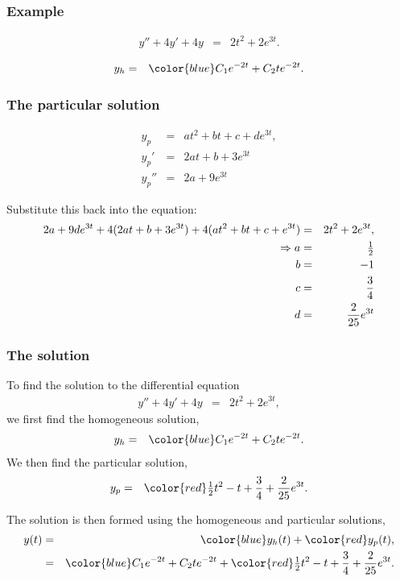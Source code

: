 \begin{frame}
  \frametitle{Example}

  \begin{eqnarray*}
    y'' + 4y' + 4y & = & 2t^2 + 2 e^{3t}.
  \end{eqnarray*}

  {
    \begin{eqnarray*}
      y_h & = & {\color{blue}C_1 e^{-2t} + C_2 t e^{-2t}}.
    \end{eqnarray*}
  }

\end{frame}


\begin{frame}
  \frametitle{The particular solution}

  \begin{eqnarray*}
    y_p & = & at^2 + bt + c + d e^{3t}, \\
    y_p' & = & 2at + b + 3e^{3t} \\
    y_p'' & = & 2a + 9 e^{3t}
  \end{eqnarray*}

  Substitute this back into the equation:
  \begin{eqnarray*}
    2a + 9de^{3t} + 4 (2at+b + 3 e^{3t}) + 4 (at^2 + bt + c + e^{3t}) & = & 2t^2+2e^{3t}, \\
    \Rightarrow 
    a & = & \mbox{$\frac{1}{2}$} \\
    b & = & -1 \\
    c & = & \frac{3}{4} \\
    d & = & \frac{2}{25} e^{3t}
  \end{eqnarray*}

\end{frame}


\begin{frame}
  \frametitle{The  solution}

  To find the solution to the differential equation
  \begin{eqnarray*}
    y'' + 4y' + 4y & = & 2t^2 + 2 e^{3t},
  \end{eqnarray*}
  we first find the homogeneous solution,
  \begin{eqnarray*}
    y_h & = & {\color{blue}C_1 e^{-2t} + C_2 t e^{-2t}}.
  \end{eqnarray*}
  We then find the particular solution,
  \begin{eqnarray*}
    y_p & = & {\color{red}\half t^2 - t +  \frac{3}{4} + \frac{2}{25} e^{3t}}.
  \end{eqnarray*}

  The solution is then formed using the homogeneous and particular solutions,
  \begin{eqnarray*}
    y(t) & = & {\color{blue}y_h(t)} + {\color{red}y_p(t)}, \\
         & = & {\color{blue}C_1 e^{-2t} + C_2 t e^{-2t}} + {\color{red}\half t^2 - t + \frac{3}{4} + \frac{2}{25} e^{3t}}.
  \end{eqnarray*}

\end{frame}



